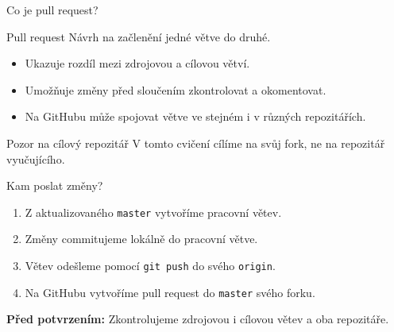 \documentclass[aspectratio=169]{beamer}
\begin{document}
\begin{frame}{Co je pull request?}
  \begin{block}{Pull request}
    Návrh na začlenění jedné větve do druhé.
  \end{block}
  \begin{itemize}
    \item Ukazuje rozdíl mezi zdrojovou a cílovou větví.
    \item Umožňuje změny před sloučením zkontrolovat a okomentovat.
    \item Na GitHubu může spojovat větve ve stejném i v různých repozitářích.
  \end{itemize}
  \begin{alertblock}{Pozor na cílový repozitář}
    V tomto cvičení cílíme na svůj fork, ne na repozitář vyučujícího.
  \end{alertblock}
\end{frame}

\begin{frame}{Kam poslat změny?}
  \begin{enumerate}
    \item Z aktualizovaného \texttt{master} vytvoříme pracovní větev.
    \item Změny commitujeme lokálně do pracovní větve.
    \item Větev odešleme pomocí \texttt{git push} do svého \texttt{origin}.
    \item Na GitHubu vytvoříme pull request do \texttt{master} svého forku.
  \end{enumerate}
  \vspace{0.35cm}
  \textbf{Před potvrzením:} Zkontrolujeme zdrojovou i cílovou větev a oba
  repozitáře.
\end{frame}
\end{document}
